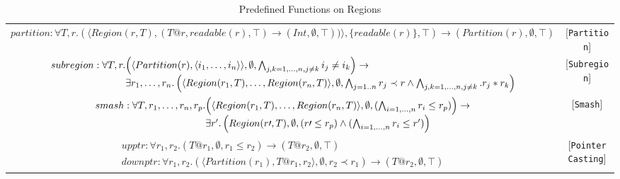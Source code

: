 \documentclass{article}
\newcommand{\rtriple}[3]{\left({#1},{#2},{#3}\right)}
\newcommand{\rsingle}[1]{\rtriple{#1}{\emptyset}{\top}}
\begin{document}
\begin{table*}
\centering
{\small
\begin{tabular}{cc}

%
%
\begin{math}
partition : \forall T,r. \rtriple{\langle Region(r,T), \rtriple{T@r}{readable(r)}{\top} \rightarrow \rsingle{\mathit{Int}}) \rangle}{\{readable(r)\}}{\top} \rightarrow \rsingle{Partition(r)}
\end{math} & [{\tt Partition}] \\

%
%
\begin{math}
\begin{array}{lc}
\begin{array}{l@{}l}
subregion : \forall T,r. & \rtriple{\langle Partition(r), \langle i_1, \ldots, i_n \rangle \rangle}{\emptyset}{\bigwedge_{j,k = 1, \ldots, n, j \ne k} i_j \ne i_k}
\rightarrow \\
& \exists r_1, \ldots, r_n. \rtriple{\langle Region(r_1,T), \ldots, Region(r_n,T) \rangle}{\emptyset}{\bigwedge_{j = 1..n} r_j \prec r \wedge \bigwedge_{j,k = 1, \ldots, n, j \ne k}. r_j * r_k}
\end{array}
\end{array}
\end{math} & [{\tt Subregion}] \\

%
%
\begin{math}
\begin{array}{l@{}l}
smash : \forall T,r_1,\ldots,r_n,r_p. & \rtriple{\langle Region(r_1,T), \ldots, Region(r_n,T) \rangle}{\emptyset}{(\bigwedge_{i = 1, \ldots, n} r_i \le r_p)} \rightarrow \\
& \exists r'.  \rtriple{Region(r\prime,T)}{\emptyset}{(r\prime \le r_p) \wedge (\bigwedge_{i = 1, \ldots, n} r_i \le r')}
\end{array}
\end{math} & [{\tt Smash}] \\

%
%
\begin{math}
\begin{array}{l}
upptr : \forall r_1, r_2. \rtriple{T@r_1}{\emptyset}{r_1 \le r_2} \rightarrow \rsingle{T@r_2} \\
downptr : \forall r_1, r_2. \rtriple{\langle Partition(r_1), T@r_1, r_2 \rangle}{\emptyset}{r_2 \prec r_1} \rightarrow \rsingle{T@r_2}
\end{array}
\end{math} & [{\tt Pointer Casting}]

\end{tabular}
}
\caption{Predefined Functions on Regions}
\end{table*}
\end{document}
